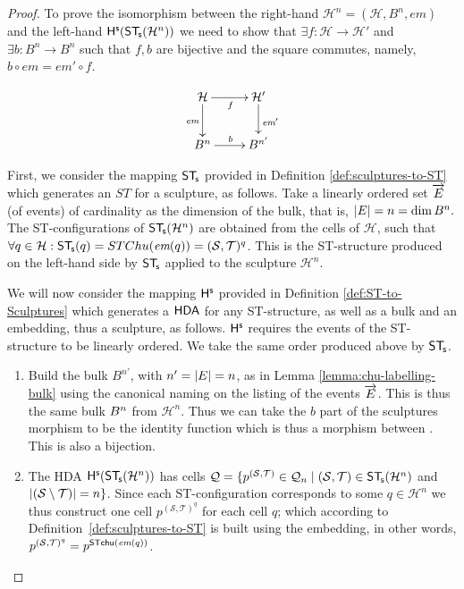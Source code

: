     \begin{proof}
        To prove the isomorphism between the right-hand $\mathcal{H}^{n}=(\mathcal{H},B^{n}, em)$ and the left-hand $\mathsf{H}^{\mathsf{s}}(\mathsf{ST}_{\!\mathsf{s}}(\mathcal{H}^{n}))$ we need to show that $\exists f: \mathcal{H} \rightarrow \mathcal{H}'$ and $\exists b:B^{n} \rightarrow B^{n}$ such that $f,b$ are bijective and the square commutes, namely, $b \circ em = em' \circ f$.
    
        \begin{equation*}
            \xymatrix{%
            \mathcal{H} \ar[d]_{\embedMorphism} \ar[r]_f & \mathcal{H}' \ar[d]^{\embedMorphism'}
            \\ \bulk{n} \ar[r]^b & \bulk{n'}
            }
        \end{equation*}

        First, we consider the mapping $\mathsf{ST}_{\!\mathsf{s}}$ provided in Definition \ref{def:sculptures-to-ST} which generates an $ST$ for a sculpture, as follows. Take a linearly ordered set $\overrightarrow{E}$ (of events) of cardinality as the dimension of the bulk, that is, $|E| = n = \dim B^{n}.$ The ST-configurations of $\mathsf{ST}_{\!\mathsf{s}}(\mathcal{H}^{n})$ are obtained from the cells of $\mathcal{H}$, such that $\forall q \in \mathcal{H} :\mathsf{ST}_{\!\mathsf{s}}(q)=STChu(\textit{em}(q))=(\mathcal{S},\mathcal{T})^{q}$. This is the ST-structure produced on the left-hand side by $\mathsf{ST}_{\!\mathsf{s}}$ applied to the sculpture $\mathcal{H}^{n}$. 

        We will now consider the mapping $\mathsf{H}^{\mathsf{s}}$ provided in Definition \ref{def:ST-to-Sculptures} which generates a $\text{\textup{\textsf{HDA}}}$ for any ST-structure, as well as a bulk and an embedding, thus a sculpture, as follows. $\mathsf{H}^{\mathsf{s}}$ requires the events of the ST-structure to be linearly ordered. We take the same order produced above by $\mathsf{ST}_{\!\mathsf{s}}$.
    
        \begin{enumerate}
            \item Build the bulk $B^{n'}$, with $n'=| E|=n$, as in Lemma \ref{lemma:chu-labelling-bulk} using the canonical naming on the listing of the events $\overrightarrow{E}$. This is thus the same bulk $B^{n}$ from $\mathcal{H}^{n}$. Thus we can take the $b$ part of the sculptures morphism to be the identity function which is thus a morphism between \HDA. This is also a bijection.
        
            \item The HDA $\mathsf{H}^{\mathsf{s}}(\mathsf{ST}_{\!\mathsf{s}}(\mathcal{H}^{n}))$ has cells $\mathcal{Q}=\{p^{(\mathcal{S},\mathcal{T})} \in \mathcal{Q}_{n} \mid (\mathcal{S},\mathcal{T}) \in \mathsf{ST}_{\!\mathsf{s}}(\mathcal{H}^{n})$ and $| (\mathcal{S} \setminus \mathcal{T})|=n\}$. Since each ST-configuration corresponds to some $q \in \mathcal{H}^{n}$ we thus construct one cell $p^{(\mathcal{S},\mathcal{T})^{q}}$ for each cell $q$; which according to Definition~\ref{def:sculptures-to-ST} is built using the embedding, in other words, $p^{(\mathcal{S}, \mathcal{T})^{q}} = p^{\mathsf{ST}\mathsf{chu}(\textit{em}(q))}$.
            

\end{enumerate}
\end{proof}

